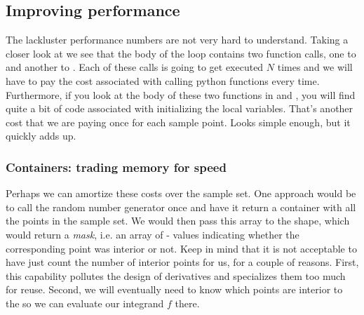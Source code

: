 
\subsection{Improving performance}
\label{sec:classes:improved-performane}

The lackluster performance numbers are not very hard to understand. Taking a closer look at
 we see that the body of the loop contains two function calls, one to
 and another to . Each of these calls is going
to get executed $N$ times and we will have to pay the cost associated with calling python
functions every time. Furthermore, if you look at the body of these two functions in
 and , you will find quite a bit of code associated
with initializing the local variables. That's another cost that we are paying once for each
sample point. Looks simple enough, but it quickly adds up.

\subsubsection{Containers: trading memory for speed}
\label{sec:classes:containers}

Perhaps we can amortize these costs over the sample set. One approach would be to call the
random number generator once and have it return a container with all the points in the sample
set. We would then pass this array to the shape, which would return a {\em mask}, i.e. an array
of - values indicating whether the corresponding point was
interior or not. Keep in mind that it is not acceptable to have  just count
the number of interior points for us, for a couple of reasons. First, this capability pollutes
the design of  derivatives and specializes them too much for reuse. Second, we
will eventually need to know which points are interior to the  so we can evaluate
our integrand $f$ there.

